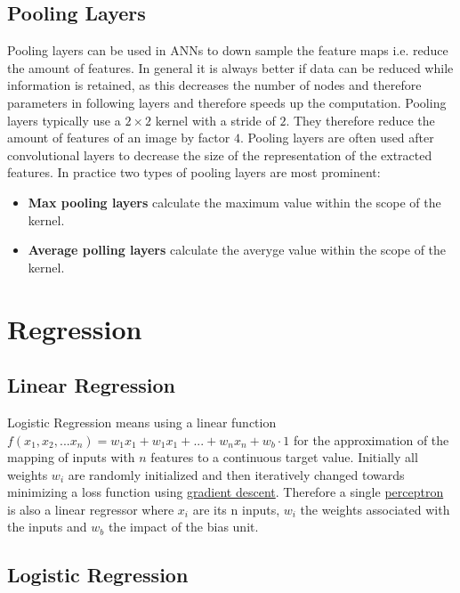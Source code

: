 \subsection{Pooling Layers}

Pooling layers can be used in ANNs to down sample the feature maps i.e. reduce the amount of features. In general it is always better if data can be reduced while information is retained, as this decreases the number of nodes and therefore parameters in following layers and therefore speeds up the computation. Pooling layers typically use a $2 \times 2$ kernel with a stride of $2$. They therefore reduce the amount of features of an image by factor $4$. Pooling layers are often used after convolutional layers to decrease the size of the representation of the extracted features. In practice two types of pooling layers are most prominent:

\begin{itemize}
    \item \textbf{Max pooling layers} calculate the maximum value within the scope of the kernel.
    \item \textbf{Average polling layers} calculate the averyge value within the scope of the kernel.
\end{itemize}


\section{Regression}

\subsection{Linear Regression}

Logistic Regression means using a linear function $f(x_{1}, x_{2}, ... x_{n}) = w_{1}x_{1} + w_{1}x_{1} + ... + w_{n}x_{n} + w_{b} \cdot 1$ for the approximation of the mapping of inputs with $n$ features to a continuous target value. Initially all weights $w_{i}$ are randomly initialized and then iteratively changed towards minimizing a loss function using \hyperref[sec:gradient_descent]{gradient descent}. Therefore a single \hyperref[sec:mlp]{perceptron} is also a linear regressor where $x_{i}$ are its n inputs, $w_{i}$ the weights associated with the inputs and $w_{b}$ the impact of the bias unit.

\subsection{Logistic Regression}

